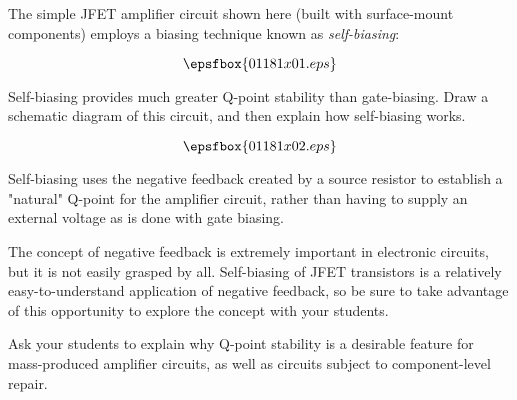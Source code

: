 

The simple JFET amplifier circuit shown here (built with surface-mount components) employs a biasing technique known as {\it self-biasing}:

$$\epsfbox{01181x01.eps}$$

Self-biasing provides much greater Q-point stability than gate-biasing.  Draw a schematic diagram of this circuit, and then explain how self-biasing works.







$$\epsfbox{01181x02.eps}$$

Self-biasing uses the negative feedback created by a source resistor to establish a "natural" Q-point for the amplifier circuit, rather than having to supply an external voltage as is done with gate biasing.







The concept of negative feedback is extremely important in electronic circuits, but it is not easily grasped by all.  Self-biasing of JFET transistors is a relatively easy-to-understand application of negative feedback, so be sure to take advantage of this opportunity to explore the concept with your students.

Ask your students to explain why Q-point stability is a desirable feature for mass-produced amplifier circuits, as well as circuits subject to component-level repair.




